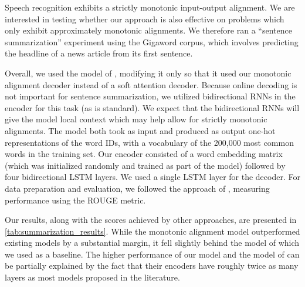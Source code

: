 \documentclass{article}
\begin{document}
Speech recognition exhibits a strictly monotonic input-output alignment.
We are interested in testing whether our approach is also effective on problems which only exhibit approximately monotonic alignments.
We therefore ran a ``sentence summarization'' experiment using the Gigaword corpus, which involves predicting the headline of a news article from its first sentence.

Overall, we used the model of , modifying it only so that it used our monotonic alignment decoder instead of a soft attention decoder.
Because online decoding is not important for sentence summarization, we utilized bidirectional RNNs in the encoder for this task (as is standard).
We expect that the bidirectional RNNs will give the model local context which may help allow for strictly monotonic alignments.
The model both took as input and produced as output one-hot representations of the word IDs, with a vocabulary of the 200,000 most common words in the training set.
Our encoder consisted of a word embedding matrix (which was initialized randomly and trained as part of the model) followed by four bidirectional LSTM layers.
We used a single LSTM layer for the decoder.
For data preparation and evaluation, we followed the approach of , measuring performance using the ROUGE metric.

Our results, along with the scores achieved by other approaches, are presented in \cref{tab:summarization_results}.
While the monotonic alignment model outperformed existing models by a substantial margin, it fell slightly behind the model of  which we used as a baseline.
The higher performance of our model and the model of  can be partially explained by the fact that their encoders have roughly twice as many layers as most models proposed in the literature.
\end{document}
